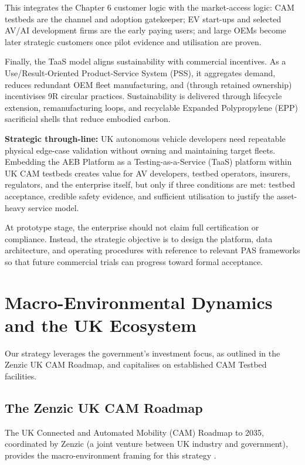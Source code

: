 \documentclass[11pt, a4paper]{report}
\numberwithin{equation}{section}
\begin{document}
\begin{refsection}
This integrates the Chapter 6 customer logic with the market-access logic: CAM testbeds are the channel and adoption gatekeeper; EV start-ups and selected AV/AI development firms are the early paying users; and large OEMs become later strategic customers once pilot evidence and utilisation are proven.

Finally, the TaaS model aligns sustainability with commercial incentives. As a Use/Result-Oriented Product-Service System (PSS), it aggregates demand, reduces redundant OEM fleet manufacturing, and (through retained ownership) incentivises 9R circular practices. Sustainability is delivered through lifecycle extension, remanufacturing loops, and recyclable Expanded Polypropylene (EPP) sacrificial shells that reduce embodied carbon.

\noindent\textbf{Strategic through-line:} UK autonomous vehicle developers need repeatable physical edge-case validation without owning and maintaining target fleets. Embedding the AEB Platform as a Testing-as-a-Service (TaaS) platform within UK CAM testbeds creates value for AV developers, testbed operators, insurers, regulators, and the enterprise itself, but only if three conditions are met: testbed acceptance, credible safety evidence, and sufficient utilisation to justify the asset-heavy service model.

At prototype stage, the enterprise should not claim full certification or compliance. Instead, the strategic objective is to design the platform, data architecture, and operating procedures with reference to relevant PAS frameworks so that future commercial trials can progress toward formal acceptance.

\section{Macro-Environmental Dynamics and the UK Ecosystem}

Our strategy leverages the government's investment focus, as outlined in the Zenzic UK CAM Roadmap, and capitalises on established CAM Testbed facilities.

\subsection{The Zenzic UK CAM Roadmap}
\label{sec:zenzic_roadmap}
\label{sec:ch7-uk-cam-roadmap}
The UK Connected and Automated Mobility (CAM) Roadmap to 2035, coordinated by Zenzic (a joint venture between UK industry and government), provides the macro-environment framing for this strategy \cite{zenzic_about}.


\end{refsection}
\end{document}
